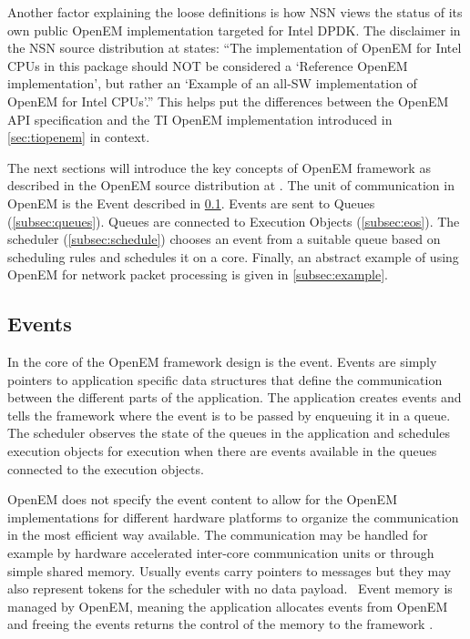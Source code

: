 Another factor explaining the loose definitions is how NSN views the status of its own public OpenEM implementation targeted for Intel DPDK. The disclaimer in the NSN source distribution at \cite{openempage} states: ``The implementation of OpenEM for Intel CPUs in this package should NOT be considered a `Reference OpenEM implementation', but rather an `Example of an all-SW implementation of OpenEM for Intel CPUs'.'' This helps put the differences between the OpenEM API specification and the TI OpenEM implementation introduced in \ref{sec:tiopenem} in context.

The next sections will introduce the key concepts of OpenEM framework as described in the OpenEM source distribution at \cite{openempage}. The unit of communication in OpenEM is the Event described in \ref{subsec:event}. Events are sent to Queues (\ref{subsec:queues}). Queues are connected to Execution Objects (\ref{subsec:eos}). The scheduler (\ref{subsec:schedule}) chooses an event from a suitable queue based on scheduling rules and schedules it on a core. Finally, an abstract example of using OpenEM for network packet processing is given in \ref{subsec:example}.

\subsection{Events}
\label{subsec:event}
In the core of the OpenEM framework design is the event. Events are simply pointers to application specific data structures that define the communication between the different parts of the application. The application creates events and tells the framework where the event is to be passed by enqueuing it in a queue. The scheduler observes the state of the queues in the application and schedules execution objects for execution when there are events available in the queues connected to the execution objects.~\cite{openemintro}

OpenEM does not specify the event content to allow for the OpenEM implementations for different hardware platforms to organize the communication in the most efficient way available. The communication may be handled for example by hardware accelerated inter-core communication units or through simple shared memory. Usually events carry pointers to messages but they may also represent tokens for the scheduler with no data payload.~\cite{openemintro} Event memory is managed by OpenEM, meaning the application allocates events from OpenEM and freeing the events returns the control of the memory to the framework \cite{openemintro}.

